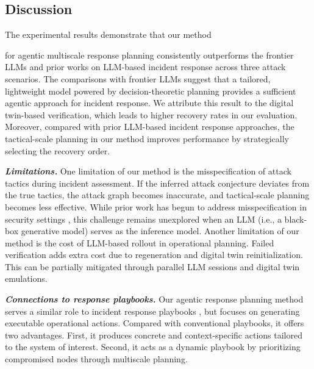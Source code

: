 \documentclass[runningheads,10pt]{llncs}
\begin{document}
\subsection{Discussion}
The experimental results demonstrate that our method 

for agentic multiscale response planning consistently outperforms the frontier LLMs and prior works on LLM-based incident response across three attack scenarios. The comparisons with frontier LLMs suggest that a tailored, lightweight model powered by decision-theoretic planning provides a sufficient agentic approach for incident response. We attribute this result to the digital twin-based verification, which leads to higher recovery rates in our evaluation. Moreover, compared with prior LLM-based incident response approaches, the tactical-scale planning in our method improves performance by strategically selecting the recovery order.

\noindent\textit{\textbf{Limitations.}}
One limitation of our method is the misspecification of attack tactics during incident assessment. If the inferred attack conjecture deviates from the true tactics, the attack graph becomes inaccurate, and tactical-scale planning becomes less effective. While prior work has begun to address misspecification in security settings \cite{kim-tao25col,kim-tao25quantization}, this challenge remains unexplored when an LLM (i.e., a black-box generative model) serves as the inference model. Another limitation of our method is the cost of LLM-based rollout in operational planning. Failed verification adds extra cost due to regeneration and digital twin reinitialization. This can be partially mitigated through parallel LLM sessions and digital twin emulations.

\noindent\textit{\textbf{Connections to response playbooks.}} Our agentic response planning method serves a similar role to incident response playbooks \cite{applebaum}, but focuses on generating executable operational actions. Compared with conventional playbooks, it offers two advantages. First, it produces concrete and context-specific actions tailored to the system of interest. Second, it acts as a dynamic playbook by prioritizing compromised nodes through multiscale planning. 
\end{document}
